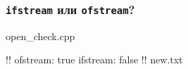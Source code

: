 \documentclass[compress, 8pt, aspectratio=169]{beamer}
\begin{document}
  \begin{frame}[fragile]

    \frametitle{\texttt{ifstream} или \texttt{ofstream}?}

        {open_check.cpp}

    \begin{terminalwindow17}
!!
ofstream: true
ifstream: false
!!
new.txt
    \end{terminalwindow17}

  \end{frame}
\end{document}

